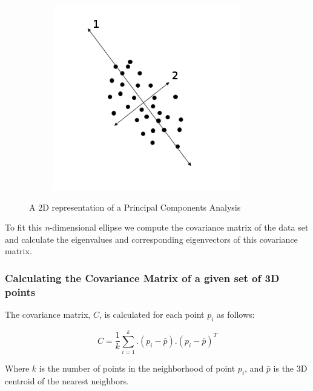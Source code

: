 \begin{figure}[H]
\begin{subfigure}{.5\textwidth}
				\label{fig:sub1}
			\end{subfigure}%
			\begin{subfigure}{.5\textwidth}
				\centering
				\includegraphics[width=1\linewidth]{Includes/images/pca2-ver2}

				\label{fig:sub2}
			\end{subfigure}
			\caption{A 2D representation of a Principal Components Analysis }
			\label{fig:PCA2D Example}
		\end{figure} 
		
		To fit this \textit{n}-dimensional ellipse we compute the covariance matrix of the data set and calculate the eigenvalues and corresponding eigenvectors of this covariance matrix.
		
		\subsubsection{Calculating the Covariance Matrix of a given set of 3D points}
			The covariance matrix, $C$, is calculated for each point $p_i$ as follows:
			
			\begin{equation}
			C = \frac{1}{k} \sum_{i=1}^{k}.(p_i - \bar{p}).(p_i - \bar{p})^T
			\end{equation}
			
			Where $k$ is the number of points in the neighborhood of point $p_i$, and $\bar{p}$ is the 3D centroid of the nearest neighbors.
				
